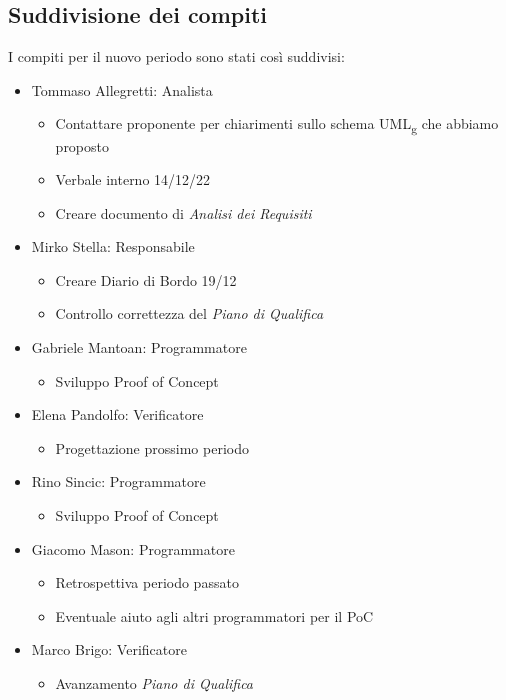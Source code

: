 \subsection{Suddivisione dei compiti}
I compiti per il nuovo periodo sono stati così suddivisi:
\begin{itemize}
	\item Tommaso Allegretti: Analista
	\begin{itemize}
		\item Contattare proponente per chiarimenti sullo schema UML\textsubscript{g} che abbiamo proposto
		\item Verbale interno 14/12/22
		\item Creare documento di \textit{Analisi dei Requisiti}
	\end{itemize}
	
	\item Mirko Stella: Responsabile
	\begin{itemize}
		\item Creare Diario di Bordo 19/12
		\item Controllo correttezza del \textit{Piano di Qualifica}
	\end{itemize}
	
	\item Gabriele Mantoan: Programmatore
	\begin{itemize}
		\item Sviluppo Proof of Concept
	\end{itemize}
	
	\item Elena Pandolfo: Verificatore
	\begin{itemize}
		\item Progettazione prossimo periodo
	\end{itemize}
	
	\item Rino Sincic: Programmatore
	\begin{itemize}
		\item Sviluppo Proof of Concept
	\end{itemize}
	
	\item Giacomo Mason: Programmatore
	\begin{itemize}
		\item Retrospettiva periodo passato
		\item Eventuale aiuto agli altri programmatori per il PoC
	\end{itemize}
	\item Marco Brigo: Verificatore
	\begin{itemize}
		\item Avanzamento \textit{Piano di Qualifica}
	\end{itemize}
\end{itemize}

